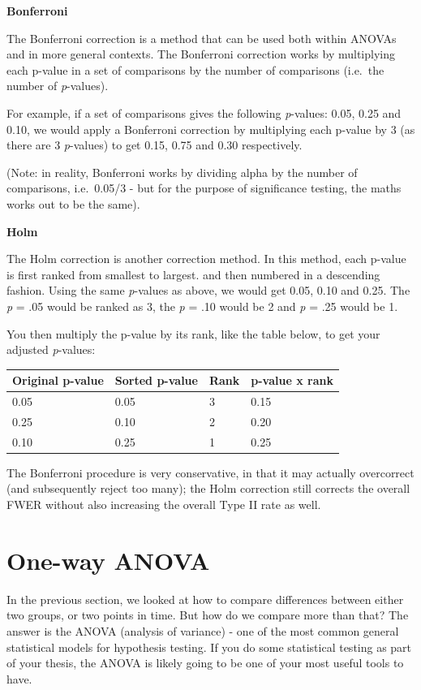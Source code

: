 \documentclass[
]{book}
\begin{document}
\textbf{Bonferroni}

The Bonferroni correction is a method that can be used both within
ANOVAs and in more general contexts. The Bonferroni correction works by
multiplying each p-value in a set of comparisons by the number of
comparisons (i.e.~the number of \emph{p}-values).

For example, if a set of comparisons gives the following \emph{p}-values: 0.05,
0.25 and 0.10, we would apply a Bonferroni correction by multiplying
each p-value by 3 (as there are 3 \emph{p}-values) to get 0.15, 0.75 and 0.30
respectively.

(Note: in reality, Bonferroni works by dividing alpha by the number of
comparisons, i.e.~0.05/3 - but for the purpose of significance testing,
the maths works out to be the same).

\textbf{Holm}

The Holm correction is another correction method. In this method, each
p-value is first ranked from smallest to largest. and then numbered in a
descending fashion. Using the same \emph{p}-values as above, we would get 0.05,
0.10 and 0.25. The \emph{p} = .05 would be ranked as 3, the \emph{p} = .10 would be 2
and \emph{p} = .25 would be 1.

You then multiply the p-value by its rank, like the table below, to get
your adjusted \emph{p}-values:

\begin{tabular}{l|l|l|l}
\hline
Original p-value & Sorted p-value & Rank & p-value x rank\\
\hline
0.05 & 0.05 & 3 & 0.15\\
\hline
0.25 & 0.10 & 2 & 0.20\\
\hline
0.10 & 0.25 & 1 & 0.25\\
\hline
\end{tabular}

The Bonferroni procedure is very conservative, in that it may actually
overcorrect (and subsequently reject too many); the Holm correction
still corrects the overall FWER without also increasing the overall Type
II rate as well.

\hypertarget{one-way-anova}{%
\section{One-way ANOVA}\label{one-way-anova}}

In the previous section, we looked at how to compare differences between
either two groups, or two points in time. But how do we compare more
than that? The answer is the ANOVA (analysis of variance) - one of the
most common general statistical models for hypothesis testing. If you do
some statistical testing as part of your thesis, the ANOVA is likely
going to be one of your most useful tools to have.
\end{document}
